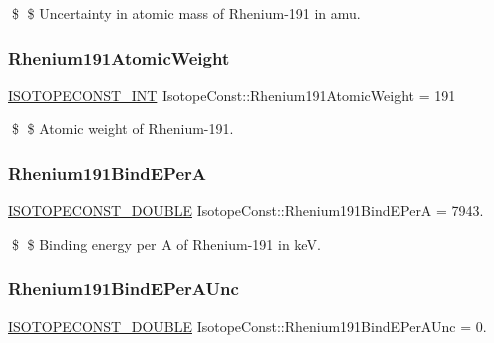 \$ \$ Uncertainty in atomic mass of Rhenium-\/191 in amu. \mbox{\label{group___isotope_const-_rhenium-_re191_gadbea80cafe1ae14f50cf8188a56c7e01}} 
\subsubsection{\texorpdfstring{Rhenium191\+Atomic\+Weight}{Rhenium191AtomicWeight}}
{\footnotesize\ttfamily \mbox{\hyperlink{group___isotope_const-_macros_ga5f18360b3e99483a35c32d789e62621c}{I\+S\+O\+T\+O\+P\+E\+C\+O\+N\+S\+T\+\_\+\+I\+NT}} Isotope\+Const\+::\+Rhenium191\+Atomic\+Weight = 191}

\$ \$ Atomic weight of Rhenium-\/191. \mbox{\label{group___isotope_const-_rhenium-_re191_gaa7b9e7ad00a43a5670efbf7b83c4598b}} 
\subsubsection{\texorpdfstring{Rhenium191\+Bind\+E\+PerA}{Rhenium191BindEPerA}}
{\footnotesize\ttfamily \mbox{\hyperlink{group___isotope_const-_macros_ga8f45a7272ce02c0b4c65c44636ed719a}{I\+S\+O\+T\+O\+P\+E\+C\+O\+N\+S\+T\+\_\+\+D\+O\+U\+B\+LE}} Isotope\+Const\+::\+Rhenium191\+Bind\+E\+PerA = 7943.}

\$ \$ Binding energy per A of Rhenium-\/191 in keV. \mbox{\label{group___isotope_const-_rhenium-_re191_ga5ec376a76f3810242cb30bf042304de0}} 
\subsubsection{\texorpdfstring{Rhenium191\+Bind\+E\+Per\+A\+Unc}{Rhenium191BindEPerAUnc}}
{\footnotesize\ttfamily \mbox{\hyperlink{group___isotope_const-_macros_ga8f45a7272ce02c0b4c65c44636ed719a}{I\+S\+O\+T\+O\+P\+E\+C\+O\+N\+S\+T\+\_\+\+D\+O\+U\+B\+LE}} Isotope\+Const\+::\+Rhenium191\+Bind\+E\+Per\+A\+Unc = 0.}

